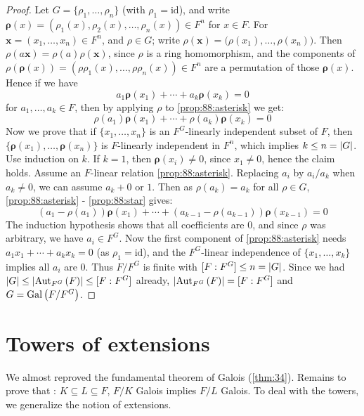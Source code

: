 \begin{proof}
  Let $G = \{ \rho_1, \ldots, \rho_n\}$ (with $\rho_1 = \text{id}$), and write $\bm{\rho}(x) = \left( \rho_1(x), \rho_2(x), \ldots, \rho_n(x) \right) \in F^n$ for $x \in F$. For $\bm{x} = (x_1, \ldots, x_n) \in F^n$, and $\rho \in G$; write $\rho(\bm{x}) = \big( \rho(x_1), \ldots, \rho(x_n) \big)$. Then $\rho(a\bm{x}) = \rho(a)\rho(\bm{x})$, since $\rho$ is a ring homomorphism, and the components of $\rho(\bm{\rho}(x)) = (\rho\rho_1(x), \ldots, \rho\rho_n(x)) \in F^n$ are a permutation of those $\bm{\rho}(x)$. Hence if we have 
 \[
 a_1\bm{\rho}(x_1) + \cdots + a_k\bm{\rho}(x_k) = 0 \tag{*} \label{prop:88:asterisk}
 \]
 for $a_1, \ldots, a_k \in F$, then by applying $\rho$ to \eqref{prop:88:asterisk} we get:
 \[
 \rho(a_1)\bm{\rho}(x_1) + \cdots + \rho(a_k)\bm{\rho}(x_k) = 0 \tag{$\star$} \label{prop:88:star}
 \]
Now we prove that if $\{x_1, \ldots, x_n\}$ is an $F^G$-linearly independent subset of $F$, then $\{ \bm{\rho}(x_1), \ldots, \bm{\rho}(x_n) \}$ is $F$-linearly independent in $F^n$, which implies $k \leq n  = \card{G}$. Use induction on $k$. If $k = 1$, then $\bm{\rho}(x_i) \neq 0$, since $x_1 \neq 0$, hence the claim holds. Assume an $F$-linear relation \eqref{prop:88:asterisk}. Replacing $a_i$ by $a_i/a_k$ when $a_k \neq 0$, we can assume $a_k + 0$ or $1$. Then as $\rho(a_k) = a_k$ for all $\rho \in G$, \eqref{prop:88:asterisk} - \eqref{prop:88:star} gives:
\[
(a_1 - \rho(a_1))\bm{\rho}(x_1) + \cdots + (a_{k-1} - \rho(a_{k-1}))\bm{\rho}(x_{k-1}) = 0
\]
The induction hypothesis shows that all coefficients are 0, and since $\rho$ was arbitrary, we have $a_i \in F^G$. Now the first component of \eqref{prop:88:asterisk} needs $a_1x_1 + \cdots + a_kx_k = 0$ (as $\rho_1 = \text{id}$), and the $F^G$-linear independence of $\{ x_1, \ldots, x_k \}$ implies all $a_i$ are 0. Thus $F/F^G$ is finite with $[F : F^G] \leq n = \card{G}$. Since we had $\card{G} \leq \card{\autset[F^G]{F}} \leq [F : F^G]$ already, $\card{\autset[F^G]{F}} = [F : F^G]$ and $G = \Gal{F/F^G}$.
\end{proof}

\section{Towers of extensions}
\label{sec:3.2}

We almost reproved the fundamental theorem of Galois (\autoref{thm:34}). Remains to prove that : $K \subseteq L \subseteq F$, $F/K$ Galois implies $F/L$ Galois. To deal with the towers, we generalize the notion of extensions.

